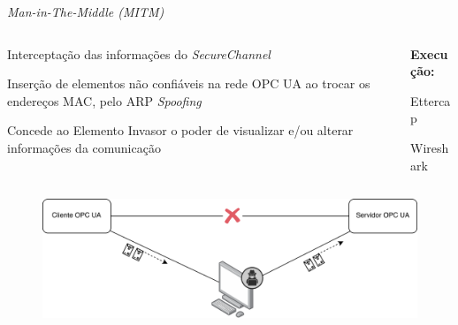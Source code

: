 \documentclass{uspBeamer}
\begin{document}
    \begin{frame}{\textit{Man-in-The-Middle (MITM)}}
        \begin{columns}
            \begin{column}{.5\textwidth}
                \begin{wideitemize}
                    \item Interceptação das informações do \textit{SecureChannel}
                    \item Inserção de elementos não confiáveis na rede OPC UA ao trocar os endereços MAC, pelo ARP \textit{Spoofing}
                    \item Concede ao Elemento Invasor o poder de visualizar e/ou alterar informações da comunicação
                \end{wideitemize}
            \end{column}
            \begin{column}{.5\textwidth}
                \textbf{Execução:}
                \begin{wideitemize}
                    \item Ettercap
                    \item Wireshark
                \end{wideitemize}
            \end{column}
        \end{columns}
        \begin{figure}
            \includegraphics[width=.7\textwidth]{mitm.png}
        \end{figure}
    \end{frame}
\end{document}
